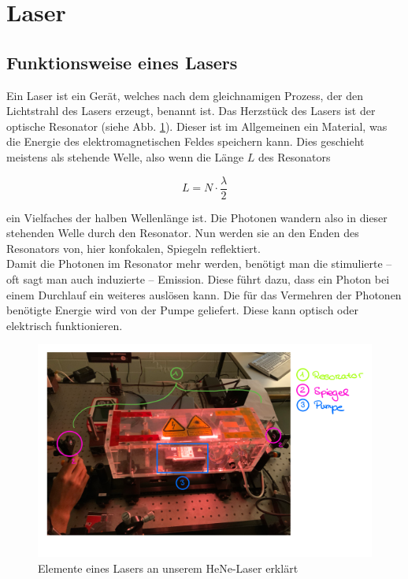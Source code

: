\section{Laser}
\subsection{Funktionsweise eines Lasers}

Ein Laser ist ein Gerät, welches nach dem gleichnamigen Prozess, der den Lichtstrahl des Lasers erzeugt, benannt ist. Das Herzstück des 
Lasers ist der optische Resonator (siehe Abb. \ref{bild:LaserAufbau}). Dieser ist im Allgemeinen ein Material, was die Energie des elektromagnetischen Feldes speichern kann. Dies 
geschieht meistens als stehende Welle, also wenn die Länge $L$ des Resonators 

\begin{equation}
    L = N\cdot\frac{\lambda}{2}
\end{equation}

ein Vielfaches der halben Wellenlänge ist. Die Photonen wandern also in dieser stehenden Welle durch den Resonator. Nun werden sie an den Enden
des Resonators von, hier konfokalen, Spiegeln reflektiert. \\
Damit die Photonen im Resonator mehr werden, benötigt man die stimulierte – oft sagt man auch induzierte – Emission. Diese führt dazu, dass ein Photon 
bei einem Durchlauf ein weiteres auslösen kann. Die für das Vermehren der Photonen benötigte Energie wird von der Pumpe geliefert. Diese kann optisch 
oder elektrisch funktionieren.\\

\begin{figure}[ht]
    \centering
    \includegraphics[width = 14cm]{Bilder/Auswertung/LaserAufbau.png}
    \caption{Elemente eines Lasers an unserem HeNe-Laser erklärt}
    \label{bild:LaserAufbau}
\end{figure}

